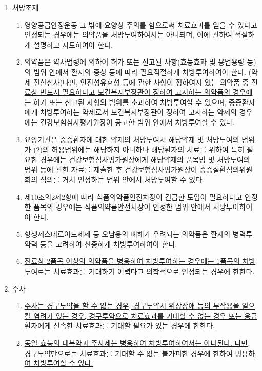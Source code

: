 \begin{enumerate}[1.]
\begin{enumerate}[가.]
	\item 처방\cntrdot{}조제
		\begin{enumerate}[(1)]\tightlist
		\item 영양공급\cntrdot{}안정\cntrdot{}운동 그 밖에 요양상 주의를 함으로써 치료효과를 얻을 수 있다고 인정되는 경우에는 의약품을 처방\cntrdot{}투여하여서는 아니되며, 이에 관하여 적절하게 설명하고 지도하여야 한다.
		\item 의약품은 약사법령에 의하여 \large{허가 또는 신고된 사항(효능\cntrdot{}효과 및 용법\cntrdot{}용량 등)의 범위 안에서 환자의 증상 등에 따라 필요\cntrdot{}적절하게 처방\cntrdot{}투여하여야 한다. (약제 전산심사)}다만, \uline{안전성\cntrdot{}유효성 등에 관한 사항이 정하여져 있는 의약품 중 진료상 반드시 필요하다고 보건복지부장관이 정하여 고시하는 의약품의 경우에는 허가 또는 신고된 사항의 범위를 초과하여 처방\cntrdot{}투여할 수 있으며}, 중증환자에게 처방\cntrdot{}투여하는 약제로서 보건복지부장관이 정하여 고시하는 약제의 경우에는 건강보험심사평가원장이 공고한 범위 안에서 처방\cntrdot{}투여할 수 있다.
		\item \uline{요양기관은 중증환자에 대한 약제의 처방\cntrdot{}투여시 해당약제 및 처방\cntrdot{}투여의 범위가 (2)의 허용범위에는 해당하지 아니하나 해당환자의 치료를 위하여 특히 필요한 경우에는 건강보험심사평가원장에게 해당약제의 품목명 및 처방\cntrdot{}투여의 범위 등에 관한 자료를 제출한 후 건강보험심사평가원장이 중증질환심의위원회의 심의를 거쳐 인정하는 범위 안에서 처방\cntrdot{}투여할 수 있다.}
		\item 제10조의2제2항에 따라 식품의약품안전처장이 긴급한 도입이 필요하다고 인정한 품목의 경우에는 식품의약품안전처장이 인정한 범위 안에서 처방\cntrdot{}투여하여야 한다.
		\item 항생제\cntrdot{}스테로이드제제 등 오남용의 폐해가 우려되는 의약품은 환자의 병력\cntrdot{}투약력 등을 고려하여 신중하게 처방\cntrdot{}투여하여야 한다.
		\item \uline{진료상 2품목 이상의 의약품을 병용하여 처방\cntrdot{}투여하는 경우에는 1품목의 처방\cntrdot{}투여로는 치료효과를 기대하기 어렵다고 의학적으로 인정되는 경우에 한한다.}
		\end{enumerate}  
	\item 주사
		\begin{enumerate}[(1)]\tightlist
		\item \uline{주사는 경구투약을 할 수 없는 경우, 경구투약시 위장장애 등의 부작용을 일으킬 염려가 있는 경우, 경구투약으로 치료효과를 기대할 수 없는 경우 또는 응급환자에게 신속한 치료효과를 기대할 필요가 있는 경우에 한한다.}
		\item \uline{동일 효능의 내복약과 주사제는 병용하여 처방\cntrdot{}투여하여서는 아니된다. 다만, 경구투약만으로는 치료효과를 기대할 수 없는 불가피한 경우에 한하여 병용하여 처방\cntrdot{}투여할 수 있다.}

\end{enumerate}
\end{enumerate}
\end{enumerate}
